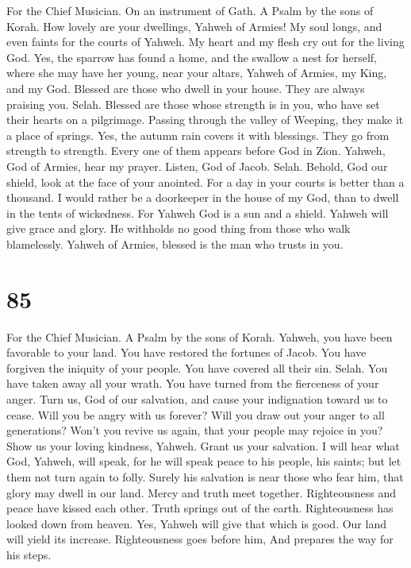 For the Chief Musician. On an instrument of Gath. A Psalm by the sons of
Korah.  How lovely are your dwellings, Yahweh of Armies!
 My soul longs, and even faints for the courts of Yahweh.
My heart and my flesh cry out for the living God.  Yes,
the sparrow has found a home, and the swallow a nest for herself, where
she may have her young, near your altars, Yahweh of Armies, my King, and
my God.  Blessed are those who dwell in your house. They
are always praising you. Selah.  Blessed are those whose
strength is in you, who have set their hearts on a pilgrimage.
 Passing through the valley of Weeping, they make it a
place of springs. Yes, the autumn rain covers it with blessings.
 They go from strength to strength. Every one of them
appears before God in Zion.  Yahweh, God of Armies, hear
my prayer. Listen, God of Jacob. Selah.  Behold, God our
shield, look at the face of your anointed.  For a day in
your courts is better than a thousand. I would rather be a doorkeeper in
the house of my God, than to dwell in the tents of wickedness.
 For Yahweh God is a sun and a shield. Yahweh will give
grace and glory. He withholds no good thing from those who walk
blamelessly.  Yahweh of Armies, blessed is the man who
trusts in you.

\hypertarget{section-77}{%
\section{85}\label{section-77}}

For the Chief Musician. A Psalm by the sons of Korah. 
Yahweh, you have been favorable to your land. You have restored the
fortunes of Jacob.  You have forgiven the iniquity of your
people. You have covered all their sin. Selah.  You have
taken away all your wrath. You have turned from the fierceness of your
anger.  Turn us, God of our salvation, and cause your
indignation toward us to cease.  Will you be angry with us
forever? Will you draw out your anger to all generations? 
Won't you revive us again, that your people may rejoice in you?
 Show us your loving kindness, Yahweh. Grant us your
salvation.  I will hear what God, Yahweh, will speak, for
he will speak peace to his people, his saints; but let them not turn
again to folly.  Surely his salvation is near those who
fear him, that glory may dwell in our land.  Mercy and
truth meet together. Righteousness and peace have kissed each other.
 Truth springs out of the earth. Righteousness has looked
down from heaven.  Yes, Yahweh will give that which is
good. Our land will yield its increase.  Righteousness
goes before him, And prepares the way for his steps.


